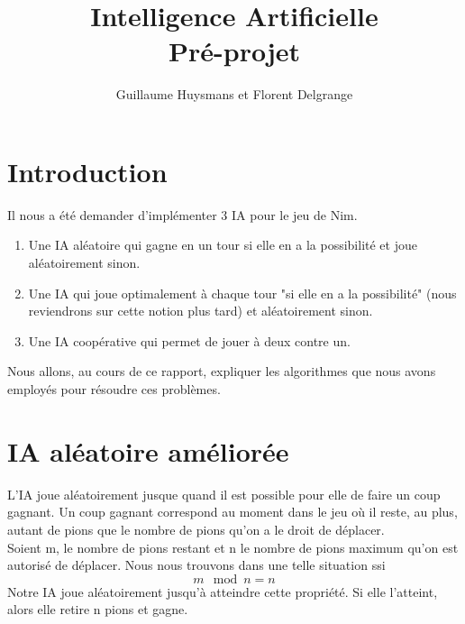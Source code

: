 \documentclass[10pt,a4paper]{article}
\author{Guillaume Huysmans et Florent Delgrange}
\title{Intelligence Artificielle\\Pré-projet}
\begin{document}
\maketitle
\section{Introduction}
Il nous a été demander d'implémenter 3 IA pour le jeu de Nim.
\begin{enumerate}
\item Une IA aléatoire qui gagne en un tour si elle en a la possibilité et joue aléatoirement sinon.
\item Une IA qui joue optimalement à chaque tour "si elle en a la possibilité" (nous reviendrons sur cette notion plus tard) et aléatoirement sinon.
\item Une IA coopérative qui permet de jouer à deux contre un.
\end{enumerate}
Nous allons, au cours de ce rapport, expliquer les algorithmes que nous avons employés pour résoudre ces problèmes.

\section{IA aléatoire améliorée}
L'IA joue aléatoirement jusque quand il est possible pour elle de faire un coup gagnant. Un coup gagnant correspond au moment dans le jeu où il reste, au plus, autant de pions que le nombre de pions qu'on a le droit de déplacer.\\
Soient m, le nombre de pions restant et n le nombre de pions maximum qu'on est autorisé de déplacer. Nous nous trouvons dans une telle situation ssi
\[m\mod n = n\]
Notre IA joue aléatoirement jusqu'à atteindre cette propriété. Si elle l'atteint, alors elle retire n pions et gagne.
\end{document}
